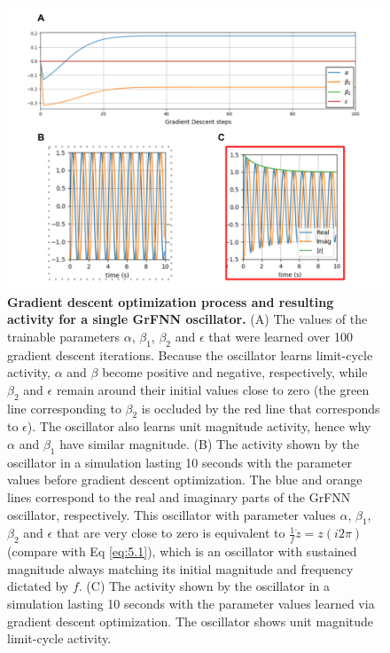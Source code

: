 \documentclass{report}
\begin{document}
\begin{figure}
    \centering
    \includegraphics[width=1.0\textwidth]{figures/fig5_1.png}
    \caption[Gradient descent optimization process and resulting activity for a single GrFNN oscillator]{\textbf{Gradient descent optimization process and resulting activity for a single GrFNN oscillator.} (A) The values of the trainable parameters $\alpha$, $\beta_1$, $\beta_2$ and $\epsilon$ that were learned over 100 gradient descent iterations. Because the oscillator learns limit-cycle activity, $\alpha$ and $\beta$ become positive and negative, respectively, while $\beta_2$ and $\epsilon$ remain around their initial values close to zero (the green line corresponding to $\beta_2$ is occluded by the red line that corresponds to $\epsilon$). The oscillator also learns unit magnitude activity, hence why $\alpha$ and $\beta_1$ have similar magnitude. (B) The activity shown by the oscillator in a simulation lasting 10 seconds with the parameter values before gradient descent optimization. The blue and orange lines correspond to the real and imaginary parts of the GrFNN oscillator, respectively. This oscillator with parameter values $\alpha$, $\beta_1$, $\beta_2$ and $\epsilon$ that are very close to zero is equivalent to $\frac{1}{f}\dot{z}=z(i2\pi)$ (compare with Eq \eqref{eq:5.1}), which is an oscillator with sustained magnitude always matching its initial magnitude and frequency dictated by $f$. (C) The activity shown by the oscillator in a simulation lasting 10 seconds with the parameter values learned via gradient descent optimization. The oscillator shows unit magnitude limit-cycle activity.} 
    \label{f5_1}
\end{figure}
\end{document}
